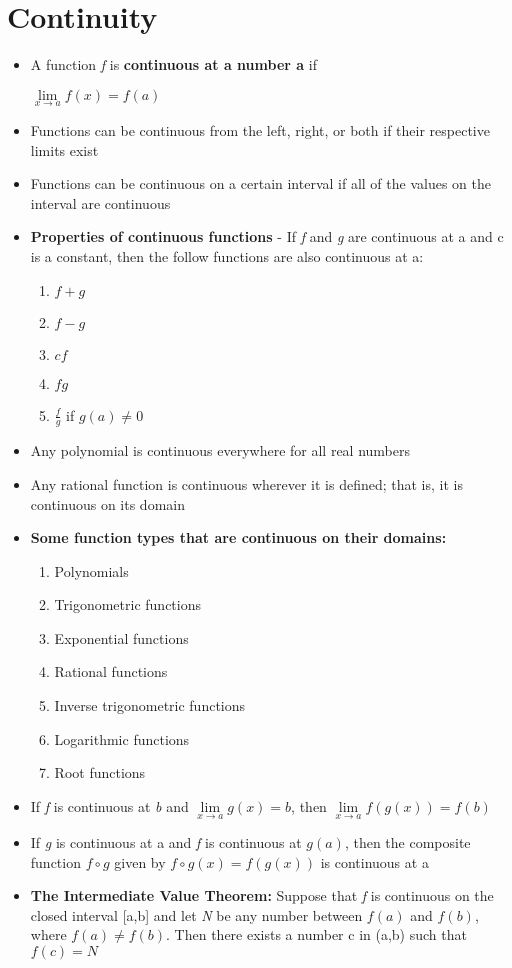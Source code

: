 \documentclass{report}
\begin{document}
		\section{Continuity}
			\begin{itemize}\addtolength{\leftskip}{2em}
				\item A function \textit{f} is \textbf{continuous at a number a} if 
					\begin{center}
					$\lim\limits_{x\rightarrow a}f(x)=f(a)$
					\end{center}
				\item Functions can be continuous from the left, right, or both if their respective limits exist
				\item Functions can be continuous on a certain interval if all of the values on the interval are continuous 
				\item \textbf{Properties of continuous functions} - If \textit{f} and \textit{g} are continuous at a and c is a constant, then the follow functions are also continuous at a:
					\begin{enumerate}\addtolength{\leftskip}{4em}
						\item $f+g$
						\item $f-g$
						\item $cf$
						\item $fg$
						\item $\frac{f}{g}$ if $g(a)\ne 0$
					\end{enumerate}
				\item Any polynomial is continuous everywhere for all real numbers
				\item Any rational function is continuous wherever it is defined; that is, it is continuous on its domain
				\newpage
				\item \textbf{Some function types that are continuous on their domains: }
				\begin{enumerate}\addtolength{\leftskip}{4em}
					\item Polynomials
					\item Trigonometric functions
					\item Exponential functions
					\item Rational functions
					\item Inverse trigonometric functions
					\item Logarithmic functions
					\item Root functions
				\end{enumerate}
				\item If \textit{f} is continuous at \textit{b} and $\lim\limits_{x\rightarrow a}g(x)=b$, then $\lim\limits_{x\rightarrow a}f(g(x))=f(b)$
				\item If \textit{g} is continuous at a and \textit{f} is continuous at $g(a)$, then the composite function $f\circ g$ given by $f\circ g(x)=f(g(x)) $ is continuous at a
				\item \textbf{The Intermediate Value Theorem: } Suppose that \textit{f} is continuous on the closed interval [a,b] and let \textit{N} be any number between $f(a)$ and $f(b)$, where $f(a)\ne f(b)$.
				Then there exists a number c in (a,b) such that $f(c)=N$
				\end{itemize}	
\end{document}
